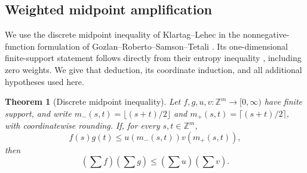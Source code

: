 \documentclass[11pt]{article}
\newtheorem{theorem}{Theorem}[section]
\theoremstyle{definition}
\theoremstyle{remark}
\numberwithin{equation}{section}
\begin{document}
\subsection{Weighted midpoint amplification}

We use the discrete midpoint inequality of Klartag--Lehec
\cite{KlartagLehec2019} in the nonnegative-function formulation of
Gozlan--Roberto--Samson--Tetali \cite[Theorem~3]{GRST2019}.  Its
one-dimensional finite-support statement follows directly from their
entropy inequality \cite[Theorem~8, equation~(9)]{GRST2019}, including
zero weights.  We give that deduction, its coordinate induction, and
all additional hypotheses used here.

\begin{theorem}[Discrete midpoint inequality]\label{thm:midpoint}
Let $f,g,u,v:\mathbb Z^m\longrightarrow[0,\infty)$ have finite support, and
write $m_-(s,t)=\lfloor(s+t)/2\rfloor$ and
$m_+(s,t)=\lceil(s+t)/2\rceil$, with coordinatewise rounding.
If, for every $s,t\in\mathbb Z^m$,
\[
 f(s)g(t)\leq u(m_-(s,t))v(m_+(s,t)),
\]
then
\[
 \left(\sum f\right)\left(\sum g\right)
 \leq\left(\sum u\right)\left(\sum v\right).
\]
\end{theorem}
\end{document}
